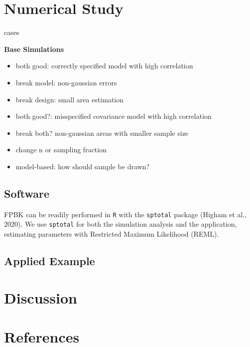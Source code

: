 \documentclass[]{elsarticle} %
\begin{document}
\hypertarget{sec:numstudy}{%
\section{Numerical Study}\label{sec:numstudy}}

cases

\textbf{Base Simulations}

\begin{itemize}
\item
  both good: correctly specified model with high correlation
\item
  break model: non-gaussian errors
\item
  break design: small area estimation
\item
  both good?: misspecified covariance model with high correlation
\item
  break both? non-gaussian areas with smaller sample size
\item
  change n or sampling fraction
\item
  model-based: how should sample be drawn?
\end{itemize}

\hypertarget{software}{%
\subsection{Software}\label{software}}

FPBK can be readily performed in \texttt{R} with the \texttt{sptotal}
package (Higham et al., 2020). We use \texttt{sptotal} for both the
simulation analysis and the application, estimating parameters with
Restricted Maximum Likelihood (REML).

\hypertarget{applied-example}{%
\subsection{Applied Example}\label{applied-example}}

\hypertarget{sec:discussion}{%
\section{Discussion}\label{sec:discussion}}

\hypertarget{references}{%
\section*{References}\label{references}}
\end{document}
